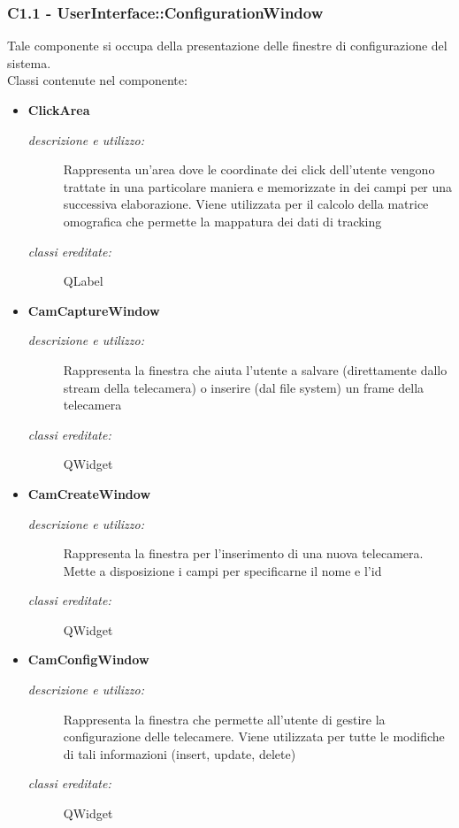 \subsubsection{C1.1 - UserInterface::ConfigurationWindow} \label{sec:c1.1}
Tale componente si occupa della presentazione delle finestre di configurazione del sistema. \\
Classi contenute nel componente: 
\begin{itemize} 
\item \textbf{ClickArea}
\begin{description}
\item [\textit{descrizione e utilizzo:}] Rappresenta un'area dove le coordinate dei click dell'utente vengono trattate in una particolare maniera e memorizzate in dei campi per una successiva elaborazione. Viene utilizzata per il calcolo della matrice omografica che permette la mappatura dei dati di tracking
\item [\textit{classi ereditate:}] QLabel
\end{description}
\item \textbf{CamCaptureWindow}
\begin{description}
\item [\textit{descrizione e utilizzo:}] Rappresenta la finestra che aiuta l'utente a salvare (direttamente dallo stream della telecamera) o inserire (dal file system) un frame della telecamera
\item [\textit{classi ereditate:}] QWidget
\end{description}
\item \textbf{CamCreateWindow}
\begin{description}
\item [\textit{descrizione e utilizzo:}] Rappresenta la finestra per l'inserimento di una nuova telecamera. Mette a disposizione i campi per specificarne il nome e l'id
\item [\textit{classi ereditate:}] QWidget
\end{description}
\item \textbf{CamConfigWindow}
\begin{description}
\item [\textit{descrizione e utilizzo:}] Rappresenta la finestra che permette all'utente di gestire la configurazione delle telecamere. Viene utilizzata per tutte le modifiche di tali informazioni (insert, update, delete)
\item [\textit{classi ereditate:}] QWidget
\end{description}
\end{itemize}

